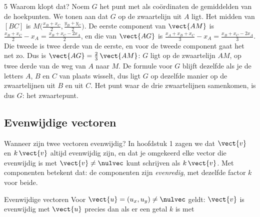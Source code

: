 \begin{alleenvoor}{5}
Waarom klopt dat? Noem $G$ het punt met als coördinaten de gemiddelden van de hoekpunten. We tonen aan dat $G$ op de zwaartelijn uit $A$ ligt. Het midden van $[BC]$ is $M\bigl(\tfrac{x_B + x_C}{2}, \tfrac{y_B + y_C}{2}\bigr)$. De eerste component van $\vect{AM}$ is $\tfrac{x_B + x_C}{2} - x_A = \tfrac{x_B + x_C - 2x_A}{2}$, en die van $\vect{AG}$ is $\tfrac{x_A + x_B + x_C}{3} - x_A = \tfrac{x_B + x_C - 2x_A}{3}$. Die tweede is twee derde van de eerste, en voor de tweede component gaat het net zo. Dus is $\vect{AG} = \tfrac23\,\vect{AM}$: $G$ ligt op de zwaartelijn $AM$, op twee derde van de weg van $A$ naar $M$. De formule voor $G$ blijft dezelfde als je de letters $A$, $B$ en $C$ van plaats wisselt, dus ligt $G$ op dezelfde manier op de zwaartelijnen uit $B$ en uit $C$. Het punt waar de drie zwaartelijnen samenkomen, is dus $G$: het zwaartepunt.


\begin{oefeningen}
\end{oefeningen}

\subsection{Evenwijdige vectoren}

Wanneer zijn twee vectoren evenwijdig? In hoofdstuk 1 zagen we dat $\vect{v}$ en $k\,\vect{v}$ altijd evenwijdig zijn, en dat je omgekeerd elke vector die evenwijdig is met $\vect{v} \neq \nulvec$ kunt schrijven als $k\,\vect{v}$. Met componenten betekent dat: de componenten zijn \textit{evenredig}, met dezelfde factor $k$ voor beide.

\begin{theorie}
\begin{stelling}{Evenwijdige vectoren}
Voor $\vect{u} = (u_x, u_y) \neq \nulvec$ geldt: $\vect{v}$ is evenwijdig met $\vect{u}$ precies dan als er een getal $k$ is met


\end{stelling}
\end{theorie}
\end{alleenvoor}
